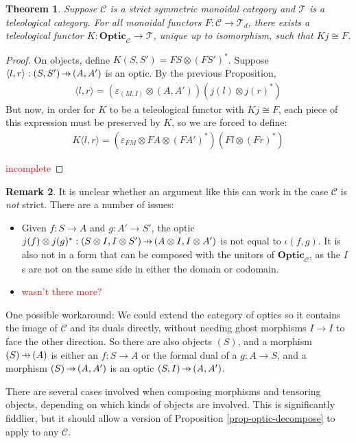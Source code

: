 \documentclass[11pt,a4paper]{article}
\theoremstyle{plain}
\newtheorem{theorem}{Theorem}[subsection]
\theoremstyle{definition}
\newtheorem{remark}[theorem]{Remark}
\newcommand{\C}{\mathscr{C}}
\newcommand{\T}{\mathscr{T}}
\newcommand{\Optic}{\mathbf{Optic}}
\newcommand{\hto}{\ensuremath{\,\mathaccent\shortmid\rightarrow\,}}
\newcommand{\todo}[1]{\textcolor{red}{\small #1}}
\begin{document}
\begin{theorem}
\label{optic-is-free-teleological-cat}
Suppose $\C$ is a strict symmetric monoidal category and $\T$ is a teleological category. For all monoidal functors $F : \C \to \T_d$, there exists a teleological functor $K : \Optic_\C \to \T$, unique up to isomorphism, such that $Kj \cong F$.
\end{theorem}
\begin{proof}
On objects, define $K(S, S') = FS \otimes (FS')^*$. Suppose $\langle l, r \rangle : (S, S') \hto (A, A')$ is an optic. By the previous Proposition,
\begin{align*}
\langle l, r \rangle = (\varepsilon_{(M, I)} \otimes (A, A'))(j(l) \otimes j(r)^*)
\end{align*}
But now, in order for $K$ to be a teleological functor with $Kj \cong F$, each piece of this expression must be preserved by $K$, so we are forced to define:
\begin{align*}
K\langle l, r \rangle = (\varepsilon_{FM} \otimes FA \otimes (FA')^*)(Fl \otimes (Fr)^* )
\end{align*}
%
%

\todo{incomplete}
\end{proof}

\begin{remark}
It is unclear whether an argument like this can work in the case $\C$ is \emph{not} strict. There are a number of issues:

\begin{itemize}
\item Given $f : S \to A$ and $g : A' \to S'$, the optic $j(f) \otimes j(g)^* : (S \otimes I, I \otimes S') \hto (A \otimes I, I \otimes A')$ is not equal to $\iota(f, g)$. It is also not in a form that can be composed with the unitors of $\Optic_\C$, as the $I$s are not on the same side in either the domain or codomain.
\item \todo{wasn't there more?}
\end{itemize}

One possible workaround: We could extend the category of optics so it contains the image of $\C$ and its duals directly, without needing ghost morphisms $I \to I$ to face the other direction. So there are also objects $(S)$, and a morphism $(S) \hto (A)$ is either an $f : S \to A$ or the formal dual of a $g : A \to S$, and a morphism $(S) \hto (A, A')$ is an optic $(S, I) \hto (A, A')$. 

There are several cases involved when composing morphisms and tensoring objects, depending on which kinds of objects are involved. This is significantly fiddlier, but it should allow a version of Proposition \ref{prop-optic-decompose} to apply to any $\C$.
\end{remark}
\end{document}
